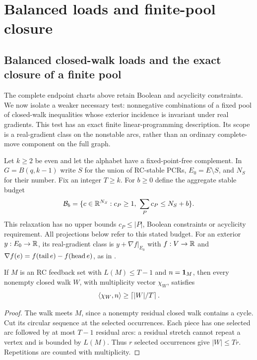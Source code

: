 \section{Balanced loads and finite-pool closure}

\subsection{Balanced closed-walk loads and the exact closure of a finite pool}
\label{sec:balanced-loads}
The complete endpoint charts above retain Boolean and acyclicity constraints.
We now isolate a weaker necessary test: nonnegative combinations of a fixed
pool of closed-walk inequalities whose exterior incidence is invariant under
real gradients. This test has an exact finite linear-programming description.
Its scope is a real-gradient class on the nonstable arcs, rather than an
ordinary complete-move component on the full graph.

Let $k\ge2$ be even and let the alphabet have a fixed-point-free complement.
In $G=B(q,k-1)$ write $S$ for the union of RC-stable PCRs,
$E_0=E\setminus S$, and $N_S$ for their number. Fix an integer $T\ge k$.
For $b\ge0$ define the aggregate stable budget
\[
 \mathcal B_b=\{c\in\mathbb R^{N_S}:c_P\ge1,\ \sum_Pc_P\le N_S+b\}.
\]
This relaxation has no upper bounds $c_P\le|P|$, Boolean constraints or
acyclicity requirement. All projections below refer to this stated budget.
For an exterior $y:E_0\to\mathbb R$, its real-gradient class is
$y+\nabla f|_{E_0}$ with $f:V\to\mathbb R$ and
$\nabla f(e)=f(\operatorname{tail} e)-f(\operatorname{head} e)$, as in .

\begin{lemma}\label{lem:walk-budget}
If $M$ is an RC feedback set with $L(M)\le T-1$ and $n=\mathbf 1_M$,
then every nonempty closed walk $W$, with multiplicity vector $\chi_W$, satisfies
\begin{equation}
 \langle\chi_W,n\rangle\ge\left\lceil|W|/T\right\rceil.\label{eq:walk-budget}
\end{equation}
\end{lemma}
\begin{proof}
The walk meets $M$, since a nonempty residual closed walk contains a cycle.
Cut its circular sequence at the selected occurrences. Each piece has one
selected arc followed by at most $T-1$ residual arcs: a residual stretch
cannot repeat a vertex and is bounded by $L(M)$. Thus $r$ selected
occurrences give $|W|\le Tr$. Repetitions are counted with multiplicity.
\end{proof}

